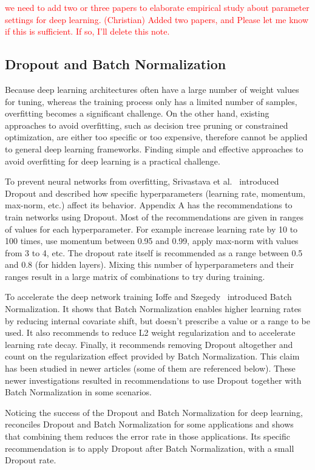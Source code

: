 \documentclass[../dropout-vs-batch-normalization.tex]{subfiles}
\begin{document}
\textcolor{red}{we need to add two or three papers to elaborate empirical study about parameter settings for deep learning. (Christian) Added two papers, \cite{Hinz2018} and \cite{Smith2018} Please let me know if this is sufficient. If so, I'll delete this note.
}


\subsection{Dropout and Batch Normalization}
Because deep learning architectures often have a large number of weight values for tuning, whereas the training process only has a limited number of samples, overfitting becomes a significant challenge. On the other hand, existing approaches to avoid overfitting, such as decision tree pruning or constrained optimization, are either too specific or too expensive, therefore cannot be applied to general deep learning frameworks. Finding simple and effective approaches to avoid overfitting for deep learning is a practical challenge. 

To prevent neural networks from overfitting, Srivastava et al.~\cite{Srivastava2014} introduced Dropout and described how specific hyperparameters (learning rate, momentum, max-norm, etc.) affect its behavior. Appendix A has the recommendations to train networks using Dropout. Most of the recommendations are given in ranges of values for each hyperparameter. For example increase learning rate by 10 to 100 times, use momentum between 0.95 and 0.99, apply max-norm with values from 3 to 4, etc. The dropout rate itself is recommended as a range between 0.5 and 0.8 (for hidden layers). Mixing this number of hyperparameters and their ranges result in a large matrix of combinations to try during training.

To accelerate the deep network training Ioffe and Szegedy~\cite{Ioffe2015} introduced Batch Normalization. It shows that Batch Normalization enables higher learning rates by reducing internal covariate shift, but doesn't prescribe a value or a range to be used. It also recommends to reduce L2 weight regularization and to accelerate learning rate decay. Finally, it recommends removing Dropout altogether and count on the regularization effect provided by Batch Normalization. This claim has been studied in newer articles (some of them are referenced below). These newer investigations resulted in recommendations to use Dropout together with Batch Normalization in some scenarios.

Noticing the success of the Dropout and Batch Normalization for deep learning, \cite{Li2018} reconciles Dropout and Batch Normalization for some applications and shows that combining them reduces the error rate in those applications. Its specific recommendation is to apply Dropout after Batch Normalization, with a small Dropout rate. 
\end{document}
